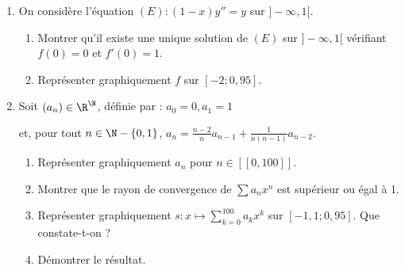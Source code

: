 \begin{Exercise}\it 
\begin{enumerate}
\item On considère l'équation $(E) : (1 - x)y'' = y$ sur $]-\infty,1[$.
\begin{enumerate}
\item Montrer qu'il existe une unique solution de $(E)$ sur $]-\infty,1[$ vérifiant $f(0) = 0$ et $f'(0) = 1$.
\item Représenter graphiquement $f$ sur $[-2;0,95]$.
\end{enumerate}

\item Soit $(a_n ) \in \R^{\N}$, définie par : $a_0 = 0,a_1 = 1$ 

et, pour tout $n\in \N -\{0,1\}$, $\displaystyle a_n = \frac{n-2}{n}a_{n-1} +  \frac{1}{n(n-1)}a_{n-2}$.
\begin{enumerate}
\item Représenter graphiquement $a_n $ pour $n\in [\![0,100]\!]$.
\item Montrer que le rayon de convergence de $\sum a_n x^n$ est supérieur ou égal à 1.
\item Représenter graphiquement $s : x\mapsto \sum\limits_{k=0}^{100}a_kx^k$ sur $[-1,1;0,95]$. Que constate-t-on ? 
\item Démontrer le résultat.
\end{enumerate}
\end{enumerate}
\end{Exercise}


